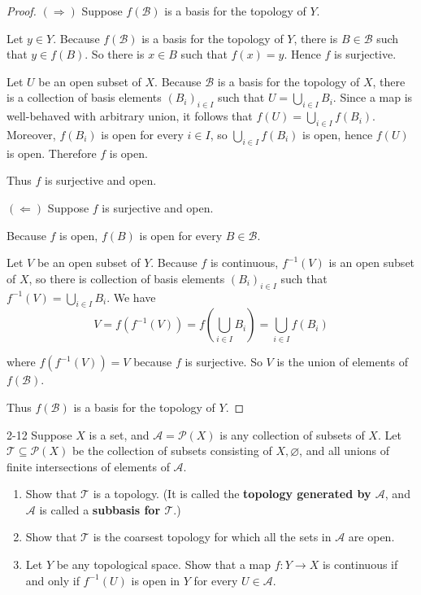 \begin{proof}
	$(\Rightarrow)$ Suppose $f(\mathscr{B})$ is a basis for the topology of $Y$.

	Let $y\in Y$. Because $f(\mathscr{B})$ is a basis for the topology of $Y$, there is $B\in\mathscr{B}$ such that $y\in f(B)$. So there is $x\in B$ such that $f(x) = y$. Hence $f$ is surjective.

	Let $U$ be an open subset of $X$. Because $\mathscr{B}$ is a basis for the topology of $X$, there is a collection of basis elements ${(B_{i})}_{i\in I}$ such that $U = \bigcup_{i\in I}B_{i}$. Since a map is well-behaved with arbitrary union, it follows that $f(U) = \bigcup_{i\in I}f(B_{i})$. Moreover, $f(B_{i})$  is open for every $i\in I$, so $\bigcup_{i\in I}f(B_{i})$ is open, hence $f(U)$ is open. Therefore $f$ is open.

	Thus $f$ is surjective and open.

	$(\Leftarrow)$ Suppose $f$ is surjective and open.

	Because $f$ is open, $f(B)$ is open for every $B\in\mathscr{B}$.

	Let $V$ be an open subset of $Y$. Because $f$ is continuous, $f^{-1}(V)$ is an open subset of $X$, so there is collection of basis elements ${(B_{i})}_{i\in I}$ such that $f^{-1}(V) = \bigcup_{i\in I}B_{i}$. We have
	\[
		V = f(f^{-1}(V)) = f\left(\bigcup_{i\in I}B_{i}\right) = \bigcup_{i\in I}f(B_{i})
	\]

	where $f(f^{-1}(V)) = V$ because $f$ is surjective. So $V$ is the union of elements of $f(\mathscr{B})$.

	Thus $f(\mathscr{B})$ is a basis for the topology of $Y$.
\end{proof}

\begin{problem}{2-12}
Suppose $X$ is a set, and $\mathscr{A} = \mathscr{P}(X)$ is any collection of subsets of $X$. Let $\mathscr{T}\subseteq \mathscr{P}(X)$ be the collection of subsets consisting of $X, \varnothing$, and all unions of finite intersections of elements of $\mathscr{A}$.
\begin{enumerate}[label={(\alph*)}]
	\item Show that $\mathscr{T}$ is a topology. (It is called the \textbf{topology generated by $\mathscr{A}$}, and $\mathscr{A}$ is called a \textbf{subbasis for $\mathscr{T}$}.)
	\item Show that $\mathscr{T}$ is the coarsest topology for which all the sets in $\mathscr{A}$ are open.
	\item Let $Y$ be any topological space. Show that a map $f: Y\to X$ is continuous if and only if $f^{-1}(U)$ is open in $Y$ for every $U\in\mathscr{A}$.
\end{enumerate}
\end{problem}

